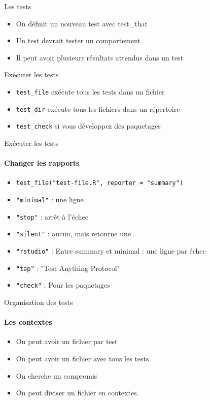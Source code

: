 \documentclass[11pt]{beamer}
\begin{document}
\begin{frame}{Les tests}
\begin{itemize}
\item On définit un nouveau test avec test\_that
\item Un test devrait tester un comportement
\item Il peut avoir plusieurs résultats attendus dans un test
\end{itemize}
\end{frame}

\begin{frame}{Exécuter les tests}
\begin{itemize}
\item {\texttt{test\_file}} exécute tous les tests dans un fichier
\item {\texttt{test\_dir}} exécute tous les fichiers dans un répertoire
\item \texttt{test\_check} si vous développez des paquetages
\end{itemize}
\end{frame}

\begin{frame}{Exécuter les tests}
\framesubtitle{Changer les rapports}
\begin{itemize}
\item \texttt{test\_file("test-file.R", reporter = "summary")}
\item \texttt{"minimal"} : une ligne
\item \texttt{"stop"} : arrêt à l'échec
\item \texttt{"silent"} : aucun, mais retourne une 
\item \texttt{"rstudio"} : Entre summary et minimal : une ligne par échec
\item \texttt{"tap"} : "Test Anything Protocol"
\item \texttt{"check"} : Pour les paquetages
\end{itemize}
\end{frame}

\begin{frame}{Organisation des tests}
\framesubtitle{Les contextes}
\begin{itemize}
\item On peut avoir un fichier par test
\item On peut avoir un fichier avec tous les tests
\item On cherche un compromis
\item On peut diviser un fichier en contextes. 
\end{itemize}
\end{frame}
\end{document}
